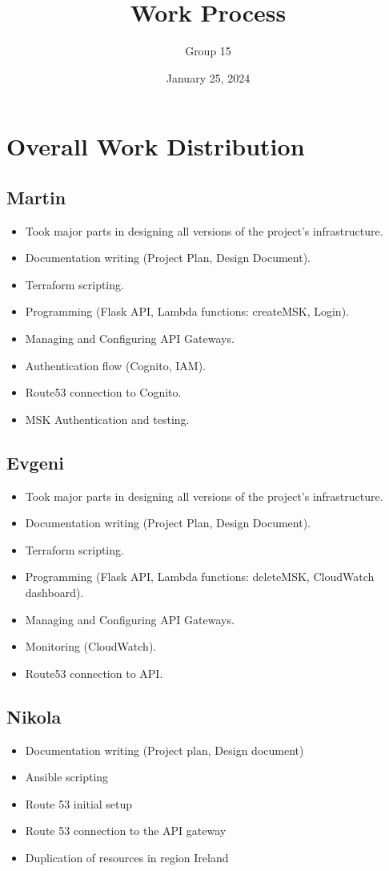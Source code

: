 \documentclass[10pt, a4paper]{article}
\title{Work Process}
\author{Group 15}
\date{January 25, 2024}
\begin{document}
\maketitle
\tableofcontents

\section{Overall Work Distribution}
\subsection{Martin}
\begin{itemize}
	\item Took major parts in designing all versions of the project's infrastructure.
	\item Documentation writing (Project Plan, Design Document).
	\item Terraform scripting.
	\item Programming (Flask API, Lambda functions: createMSK, Login).
	\item Managing and Configuring API Gateways.
	\item Authentication flow (Cognito, IAM).
	\item Route53 connection to Cognito.
	\item MSK Authentication and testing.

\end{itemize}

\subsection{Evgeni}
\begin{itemize}
	\item Took major parts in designing all versions of the project's infrastructure.
	\item Documentation writing (Project Plan, Design Document).
	\item Terraform scripting.
	\item Programming (Flask API, Lambda functions: deleteMSK, CloudWatch dashboard).
	\item Managing and Configuring API Gateways.
	\item Monitoring (CloudWatch).
	\item Route53 connection to API.
\end{itemize}

\subsection{Nikola}
\begin{itemize}
	\item Documentation writing (Project plan, Design document)
	\item Ansible scripting
	\item Route 53 initial setup
	\item Route 53 connection to the API gateway
	\item Duplication of resources in region Ireland
\end{itemize}
\end{document}
